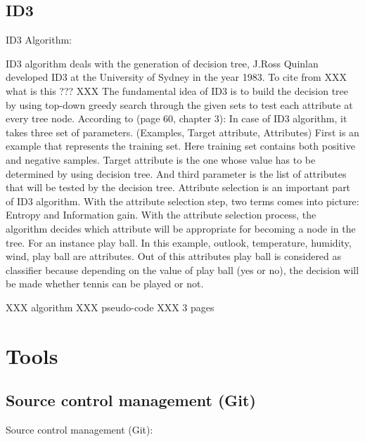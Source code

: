 \documentclass{report}
\begin{document}
\subsection{ID3}
\label{sec:ID3}

ID3 Algorithm:

ID3 algorithm deals with the generation of decision tree, J.Ross Quinlan developed ID3 at the University of Sydney in the year 1983. To cite from \cite{OverviewOfDecisionTrees} XXX what is this ??? XXX
The fundamental idea of ID3 is to build the decision tree by using top-down greedy search through the given sets to test each attribute at every tree node.
According to \cite{Mitchell1997MachineLearning}(page 60, chapter 3): In case of ID3 algorithm, it takes three set of parameters.
(Examples, Target attribute, Attributes)
First is an example that represents the training set. Here training set contains both positive and negative samples. Target attribute is the one whose value has to be determined by using decision tree. And third parameter is the list of attributes that will be tested by the decision tree. Attribute selection is an important part of ID3 algorithm. With the attribute selection step, two terms comes into picture: Entropy and Information gain. With the attribute selection process, the algorithm decides which attribute will be appropriate for becoming a node in the tree.
For an instance play ball. In this example, outlook, temperature, humidity, wind, play ball are attributes. Out of this attributes play ball is considered as classifier because depending on the value of play ball (yes or no), the decision will be made whether tennis can be played or not.

XXX algorithm XXX pseudo-code XXX 3 pages



\section{Tools}
\label{sec:Tools}

\subsection{Source control management (Git)}
\label{sec:scm}

Source control management (Git):
\end{document}

